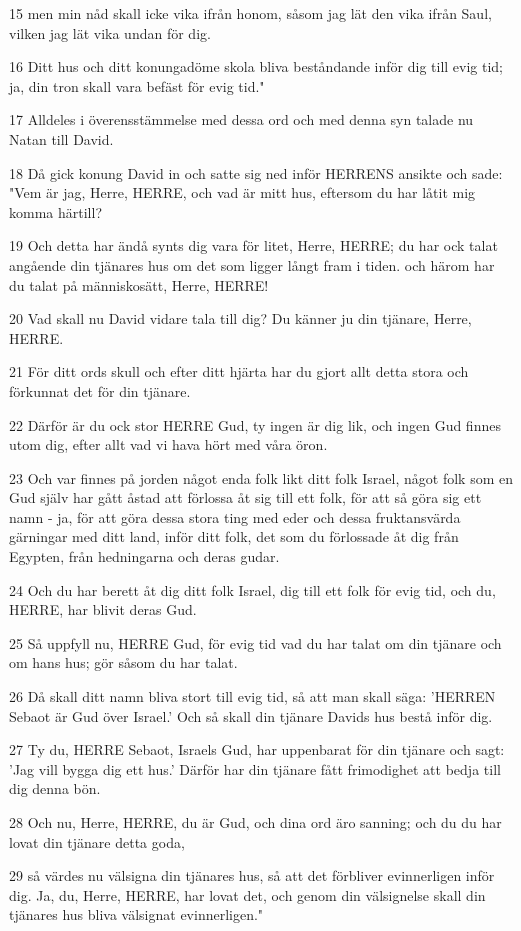 \par 15 men min nåd skall icke vika ifrån honom, såsom jag lät den vika ifrån Saul, vilken jag lät vika undan för dig.
\par 16 Ditt hus och ditt konungadöme skola bliva beståndande inför dig till evig tid; ja, din tron skall vara befäst för evig tid."
\par 17 Alldeles i överensstämmelse med dessa ord och med denna syn talade nu Natan till David.
\par 18 Då gick konung David in och satte sig ned inför HERRENS ansikte och sade: "Vem är jag, Herre, HERRE, och vad är mitt hus, eftersom du har låtit mig komma härtill?
\par 19 Och detta har ändå synts dig vara för litet, Herre, HERRE; du har ock talat angående din tjänares hus om det som ligger långt fram i tiden. och härom har du talat på människosätt, Herre, HERRE!
\par 20 Vad skall nu David vidare tala till dig? Du känner ju din tjänare, Herre, HERRE.
\par 21 För ditt ords skull och efter ditt hjärta har du gjort allt detta stora och förkunnat det för din tjänare.
\par 22 Därför är du ock stor HERRE Gud, ty ingen är dig lik, och ingen Gud finnes utom dig, efter allt vad vi hava hört med våra öron.
\par 23 Och var finnes på jorden något enda folk likt ditt folk Israel, något folk som en Gud själv har gått åstad att förlossa åt sig till ett folk, för att så göra sig ett namn - ja, för att göra dessa stora ting med eder och dessa fruktansvärda gärningar med ditt land, inför ditt folk, det som du förlossade åt dig från Egypten, från hedningarna och deras gudar.
\par 24 Och du har berett åt dig ditt folk Israel, dig till ett folk för evig tid, och du, HERRE, har blivit deras Gud.
\par 25 Så uppfyll nu, HERRE Gud, för evig tid vad du har talat om din tjänare och om hans hus; gör såsom du har talat.
\par 26 Då skall ditt namn bliva stort till evig tid, så att man skall säga: 'HERREN Sebaot är Gud över Israel.' Och så skall din tjänare Davids hus bestå inför dig.
\par 27 Ty du, HERRE Sebaot, Israels Gud, har uppenbarat för din tjänare och sagt: 'Jag vill bygga dig ett hus.' Därför har din tjänare fått frimodighet att bedja till dig denna bön.
\par 28 Och nu, Herre, HERRE, du är Gud, och dina ord äro sanning; och du du har lovat din tjänare detta goda,
\par 29 så värdes nu välsigna din tjänares hus, så att det förbliver evinnerligen inför dig. Ja, du, Herre, HERRE, har lovat det, och genom din välsignelse skall din tjänares hus bliva välsignat evinnerligen."

